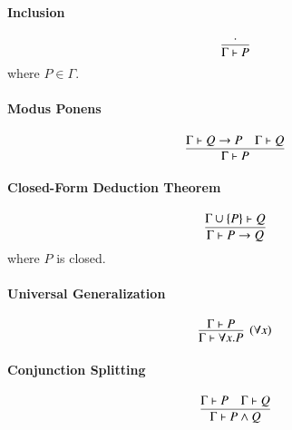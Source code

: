 \documentclass{article}
\theoremstyle{plain}
\begin{document}
\paragraph{Inclusion}
$$
\infer{\Gamma \vdash P}{\cdot}
$$
where $P \in \Gamma$.

\paragraph{Modus Ponens}
$$
\infer{\Gamma \vdash P}
      {\Gamma \vdash Q \to P
      &\Gamma \vdash Q}
$$

\paragraph{Closed-Form Deduction Theorem}
$$
\infer{\Gamma \vdash P \to Q}
{\Gamma \cup \{P\} \vdash Q}
$$
where $P$ is closed.

\paragraph{Universal Generalization}
$$
\infer[(\forall x)]{\Gamma \vdash \forall x . P}
      {\Gamma \vdash P}
$$

\paragraph{Conjunction Splitting}
$$
\infer{\Gamma \vdash P \wedge Q}
      {\Gamma \vdash P
      &\Gamma \vdash Q}
$$
\end{document}
